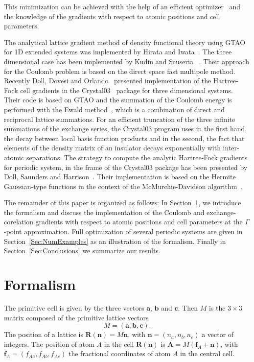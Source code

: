 \documentclass[prl,twocolumn,showpacs,twocolumngrid,superbib]{revtex4}
\begin{document}
This minimization can be achieved with the help of an 
efficient optimizer~\cite{KNemeth04,TBucko05,KNemeth05}
and the knowledge of the gradients with respect to atomic 
positions and cell parameters.

The analytical lattice gradient method of density functional theory using GTAO for
1D extended systems was implemented by Hirata and Iwata~\cite{SHirata98}.
The three dimensional case has been implemented by Kudin and Scuseria
~\cite{KKudin00A,KKudin00B}. Their approach for the Coulomb problem is
based on the direct space fast multipole method.
Recently Doll, Dovesi and Orlando~\cite{KDoll04} presented
implementation of the Hartree-Fock cell gradients in
the {\sc Crystal03}~\cite{RDovesi00} package for three dimensional systems.
Their code is based on GTAO and the summation
of the Coulomb energy is performed with the Ewald method~\cite{PEwald21},
which is a combination of direct and reciprocal lattice summations.
For an efficient truncation of the three infinite summations of the exchange
series, the {\sc Crystal03} program uses in the first hand, the decay between local basis function
products and in the second, the fact that elements of the density
matrix of an insulator decays exponentially with inter-atomic separations.
The strategy to compute the analytic Hartree-Fock gradients for
periodic system, in the frame of the {\sc Crystal03} package has been
presented by Doll, Saunders and Harrison~\cite{KDoll01}.
Their implementation is based on the Hermite Gaussian-type functions
in the context of the McMurchie-Davidson algorithm~\cite{LMcmurchie78}.

The remainder of this paper is organized as follows:
In Section~\ref{Sec:Formalism}, we introduce the formalism and discuss
the implementation of the Coulomb and exchange-corelation gradients with respect
to atomic positions and cell parameters
at the $\Gamma$-point approximation. Full optimization of several periodic systems are given
in Section~\ref{Sec:NumExamples} as an illustration of the formalism.
Finally in Section~\ref{Sec:Conclusions} we summarize our results.

\section{Formalism}\label{Sec:Formalism}
The primitive cell is given by the three vectors $\mathbf{a}$,
$\mathbf{b}$ and $\mathbf{c}$. Then $M$ is the $3\times3$ matrix composed
of the primitive lattice vectors
\begin{equation}
  M=(\mathbf{a},\mathbf{b},\mathbf{c}).
\end{equation}
The position of a lattice is $\mathbf{R(n)}=M\mathbf{n}$,
with $\mathbf{n}=(n_a,n_b,n_c)$ a vector of integers.
The position of atom $A$ in the cell $\mathbf{R(n)}$ is $\mathbf{A}=M(\mathbf{f}_A+\mathbf{n})$,
with $\mathbf{f}_A=(f_{Aa},f_{Ab},f_{Ac})$ the fractional coordinates of
atom $A$ in the central cell.
\end{document}

